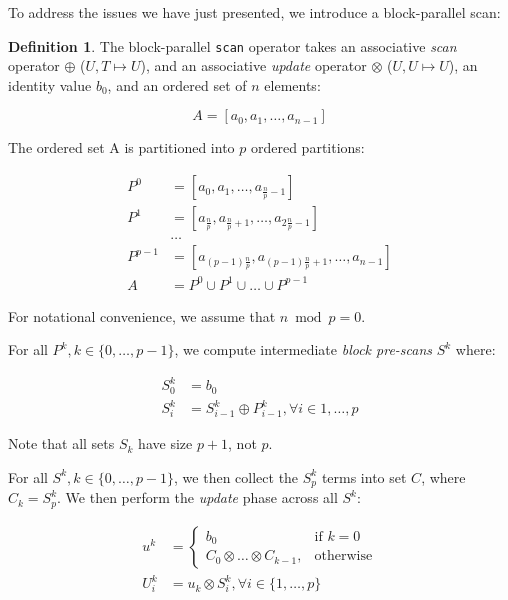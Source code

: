\documentclass[preprint]{sigplanconf}
\theoremstyle{definition}
\newtheorem{defn}{Definition}
\begin{document}
To address the issues we have just presented, we introduce a block-parallel scan:

\begin{defn}
\label{defn:block-parallel-scan}
The block-parallel \texttt{scan} operator takes an associative \emph{scan} operator $\oplus$ ($U, T
\mapsto U$), and an associative \emph{update} operator $\otimes$ ($U, U \mapsto U$), an identity
value $b_0$, and an ordered set of $n$ elements:

$$
A = [a_0, a_1, \ldots, a_{n - 1}]
$$

The ordered set A is partitioned into $p$ ordered partitions:

\begin{equation*}
\begin{split}
P^0 &= [a_0, a_1, \ldots, a_{\frac{n}{p} - 1}] \\
P^1 &= [a_{\frac{n}{p}}, a_{\frac{n}{p} + 1}, \ldots, a_{2\frac{n}{p} - 1}] \\
&\ldots \\
P^{p - 1} &= [a_{(p - 1)\frac{n}{p}}, a_{(p - 1)\frac{n}{p} + 1}, \ldots, a_{n - 1}] \\
A &= P^0 \cup P^1 \cup \ldots \cup P^{p - 1}
\end{split}
\end{equation*}

For notational convenience, we assume that $n \bmod p = 0$.

For all $P^k, k \in \{0, \ldots, p - 1\}$, we compute intermediate \emph{block pre-scans} $S^k$ where:

\begin{equation*}
\begin{split}
S^k_0 &= b_0 \\
S^k_i &= S^k_{i - 1} \oplus P^k_{i - 1}, \forall i \in {1, \ldots, p}
\end{split}
\end{equation*}

Note that all sets $S_k$ have size $p + 1$, not $p$.

For all $S^k, k \in \{0, \ldots, p - 1\}$, we then collect the $S^k_p$ terms into set $C$, where $C_k =
S^k_p$. We then perform the \emph{update} phase across all $S^k$:

\begin{equation*}
\begin{split}
u^k &= \begin{cases}
    b_0& \text{if } k = 0\\
    C_0 \otimes \ldots \otimes C_{k - 1}, & \text{otherwise}
\end{cases} \\
U^k_i &= u_k \otimes S^k_i, \forall i \in \{1, \ldots, p\}
\end{split}
\end{equation*}


\end{defn}
\end{document}
